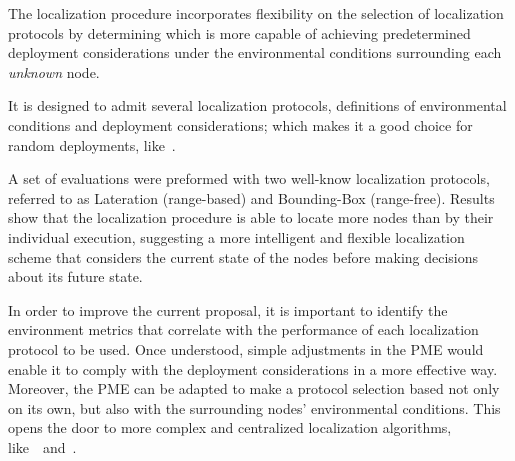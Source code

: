 The localization procedure incorporates flexibility on the selection of localization protocols by determining which is more capable of achieving predetermined deployment considerations under the environmental conditions surrounding each \emph{unknown} node. 

It is designed to admit several localization protocols, definitions of environmental conditions and deployment considerations; which makes it a good choice for random deployments, like~\cite{airDroppedVolvano}.

A set of evaluations were preformed with two well-know localization protocols, referred to as Lateration (range-based) and Bounding-Box (range-free). Results show that the localization procedure is able to locate more nodes than by their individual execution, suggesting a more intelligent and flexible localization scheme that considers the current state of the nodes before making decisions about its future state.


In order to improve the current proposal, it is important to identify the environment metrics that correlate with the performance of each localization protocol to be used. Once understood, simple adjustments in the PME would enable it to comply with the deployment considerations in a more effective way. Moreover, the PME can be adapted to make a protocol selection based not only on its own, but also with the surrounding nodes' environmental conditions. This opens the door to more complex and centralized localization algorithms, like~\cite{pal2010localization}~and~\cite{alippi2006rssi}.